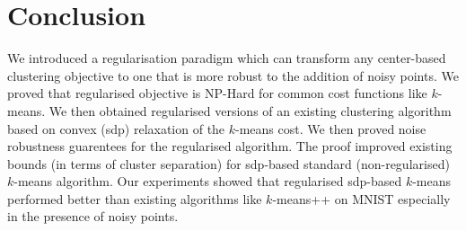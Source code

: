\documentclass[12pt]{article}
\begin{document}
\section{Conclusion}
We introduced a regularisation paradigm which can transform any center-based clustering objective to one that is more robust to the addition of noisy points.  We proved that regularised objective is NP-Hard for common cost functions like $k$-means. We then obtained regularised versions of an existing clustering algorithm based on convex (sdp) relaxation of the $k$-means cost. We then proved noise robustness guarentees for the regularised algorithm. The proof improved existing bounds (in terms of cluster separation) for sdp-based standard (non-regularised) $k$-means algorithm. Our experiments showed that regularised sdp-based $k$-means performed better than existing algorithms like $k$-means++ on MNIST especially in the presence of noisy points.

\ifdefined\COMPLETE
\else 
\end{document}
